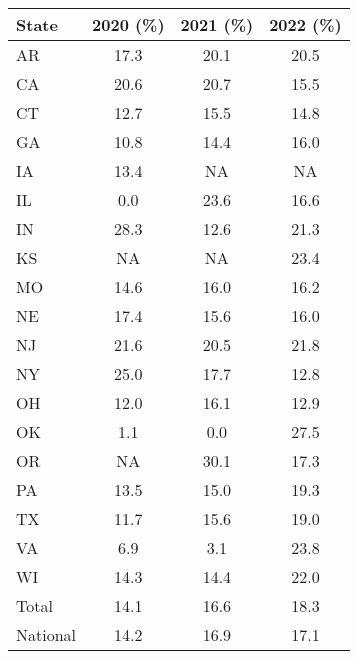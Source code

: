 \centering
\begin{tabular}{lccc}
\toprule
State & 2020 (\%) & 2021 (\%) & 2022 (\%) \\
\midrule
AR & 17.3 & 20.1 & 20.5 \\
CA & 20.6 & 20.7 & 15.5 \\
CT & 12.7 & 15.5 & 14.8 \\
GA & 10.8 & 14.4 & 16.0 \\
IA & 13.4 & NA & NA \\
IL & 0.0 & 23.6 & 16.6 \\
IN & 28.3 & 12.6 & 21.3 \\
KS & NA & NA & 23.4 \\
MO & 14.6 & 16.0 & 16.2 \\
NE & 17.4 & 15.6 & 16.0 \\
NJ & 21.6 & 20.5 & 21.8 \\
NY & 25.0 & 17.7 & 12.8 \\
OH & 12.0 & 16.1 & 12.9 \\
OK & 1.1 & 0.0 & 27.5 \\
OR & NA & 30.1 & 17.3 \\
PA & 13.5 & 15.0 & 19.3 \\
TX & 11.7 & 15.6 & 19.0 \\
VA & 6.9 & 3.1 & 23.8 \\
WI & 14.3 & 14.4 & 22.0 \\
\midrule
Total & 14.1 & 16.6 & 18.3 \\
National & 14.2 & 16.9 & 17.1 \\
\bottomrule
\end{tabular}
\label{tab:turnover_rates}

